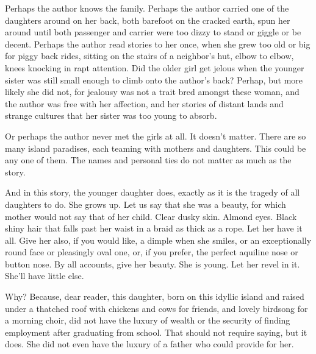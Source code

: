 \documentclass{amsart}
\begin{document}
Perhaps the author knows the family. Perhaps the author carried one of the daughters around on her back, both barefoot on the cracked earth, spun her around until both passenger and carrier were too dizzy to stand or giggle or be decent. Perhaps the author read stories to her once, when she grew too old or big for piggy back rides, sitting on the stairs of a neighbor's hut, elbow to elbow, knees knocking in rapt attention. Did the older girl get jelous when the younger sister was still small enough to climb onto the author's back? Perhap, but more likely she did not, for jealousy was not a trait bred amongst these woman, and the author was free with her affection, and her stories of distant lands and strange cultures that her sister was too young to absorb.

Or perhaps the author never met the girls at all. It doesn't matter. There are so many island paradises, each teaming with mothers and daughters. This could be any one of them. The names and personal ties do not matter as much as the story.

And in this story, the younger daughter does, exactly as it is the tragedy of all daughters to do. She grows up. Let us say that she was a beauty, for which mother would not say that of her child. Clear dusky skin. Almond eyes. Black shiny hair that falls past her waist in a braid as thick as a rope. Let her have it all. Give her also, if you would like, a dimple when she smiles, or an exceptionally round face or pleasingly oval one, or, if you prefer, the perfect aquiline nose or button nose. By all accounts, give her beauty. She is young. Let her revel in it. She'll have little else.

Why? Because, dear reader, this daughter, born on this idyllic island and raised under a thatched roof with chickens and cows for friends, and lovely birdsong for a morning choir, did not have the luxury of wealth or the security of finding employment after graduating from school. That should not require saying, but it does. She did not even have the luxury of a father who could provide for her. 
\end{document}
